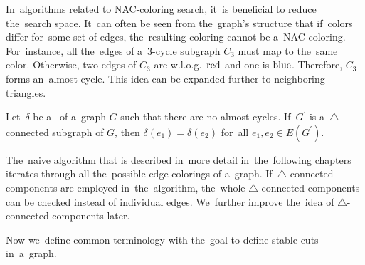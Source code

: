 In~algorithms related to NAC-coloring search, it~is beneficial
to reduce the~search space.
It~can often be seen from the~graph's structure
that if~colors differ for~some set of edges,
the~resulting coloring cannot be a~NAC-coloring.
%
For~instance, all the~edges of a~3-cycle subgraph \( C_3 \) must map to the~same color.
Otherwise, two edges of \( C_3 \) are w.l.o.g.\ \( \text{red} \) and one is \( \text{blue} \).
Therefore, \( C_3 \) forms an~almost cycle.
This idea can be expanded further to neighboring triangles.
%
%
\begin{lemma}
	Let~\( \delta \) be a~\rbcol{} of a~graph \( G \) such that there are
	no almost cycles. If~\( G^\prime \) is
	a~\( \triangle \)-connected subgraph of \( G \),
	then \( \delta(e_1) = \delta(e_2) \) for~all \( e_1, e_2 \in E(G^\prime) \).
\end{lemma}
%
The~naive algorithm that is described in~more detail in~the~following chapters
iterates through all the~possible edge colorings of a~graph.
If~\( \triangle \)-connected components are employed in~the~algorithm,
the~whole \( \triangle \)-connected components can be checked instead of individual edges.
We~further improve the~idea of \( \triangle \)-connected components later.

Now we~define common terminology with the~goal to define stable cuts in~a~graph.

